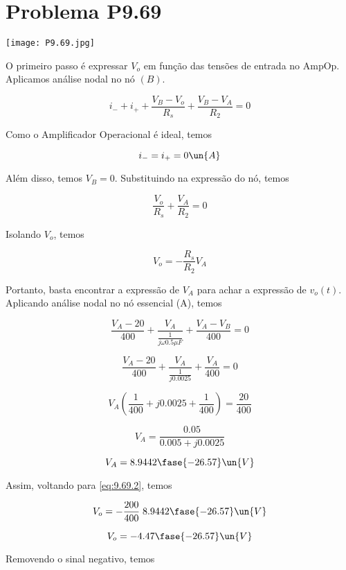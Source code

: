 \section*{Problema P9.69}

\renewcommand*\thesection{9.69}

\begin{center}
    \texttt{[image: P9.69.jpg]}
\end{center}

O primeiro passo é expressar $V_o$ em função das tensões de entrada no AmpOp.
Aplicamos análise nodal no nó $(B)$.

\[ i_- + i_+ + \frac{V_B - V_o}{R_s} + \frac{V_B - V_A}{R_2} = 0 \]

Como o Amplificador Operacional é ideal, temos

\begin{equation}\label{eq:9.69.1}
    i_- = i_+ = 0 \un{A}
\end{equation}

Além disso, temos $V_B = 0$. Substituindo na expressão do nó, temos

\[ \frac{V_o}{R_s} + \frac{V_A}{R_2} = 0 \]

Isolando $V_o$, temos

\begin{equation}\label{eq:9.69.2}
    V_o = -\frac{R_s}{R_2} V_A
\end{equation}

Portanto, basta encontrar a expressão de $V_A$ para achar a expressão de $v_o(t)$. \\
Aplicando análise nodal no nó essencial (A), temos

\[ \frac{V_A - 20}{400} + \frac{V_A}{\frac{1}{j\omega 0.5\mu F}} + \frac{V_A - V_B}{400} = 0 \]

\[ \frac{V_A - 20}{400} + \frac{V_A}{\frac{1}{j0.0025}} + \frac{V_A}{400} = 0 \]

\[ V_A\left(\frac{1}{400} + j0.0025 + \frac{1}{400}\right) = \frac{20}{400}\]

\[ V_A = \frac{0.05}{0.005 + j0.0025} \]

\[ V_A = 8.9442\fase{-26.57} \un{V} \]

Assim, voltando para \eqref{eq:9.69.2}, temos

\[ V_o = -\frac{200}{400} \; 8.9442\fase{-26.57} \un{V} \]

\[ V_o = -4.47\fase{-26.57} \un{V} \]

Removendo o sinal negativo, temos


